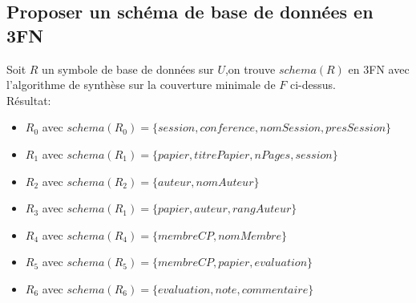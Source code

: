 \documentclass[10pt,a4paper,twoside]{article}
\begin{document}
\subsection{Proposer un schéma de base de données en 3FN}
Soit $R$ un symbole de base de données sur $U$,on trouve $schema(R)$ en 3FN avec l'algorithme de synthèse sur la couverture minimale de $F$ ci-dessus.\\
Résultat:
\begin{itemize}
\item $R_{0}$ avec $schema(R_{0})=\{session, conference, nomSession,presSession\}$
\item $R_{1}$ avec $schema(R_{1})=\{papier, titrePapier, nPages,session\}$
\item $R_{2}$ avec $schema(R_{2})=\{auteur, nomAuteur\}$
\item $R_{3}$ avec $schema(R_{1})=\{papier, auteur, rangAuteur\}$
\item $R_{4}$ avec $schema(R_{4})=\{membreCP, nomMembre\}$
\item $R_{5}$ avec $schema(R_{5})=\{membreCP, papier, evaluation\}$
\item $R_{6}$ avec $schema(R_{6})=\{evaluation,note,commentaire\}$
\end{itemize}
\end{document}
